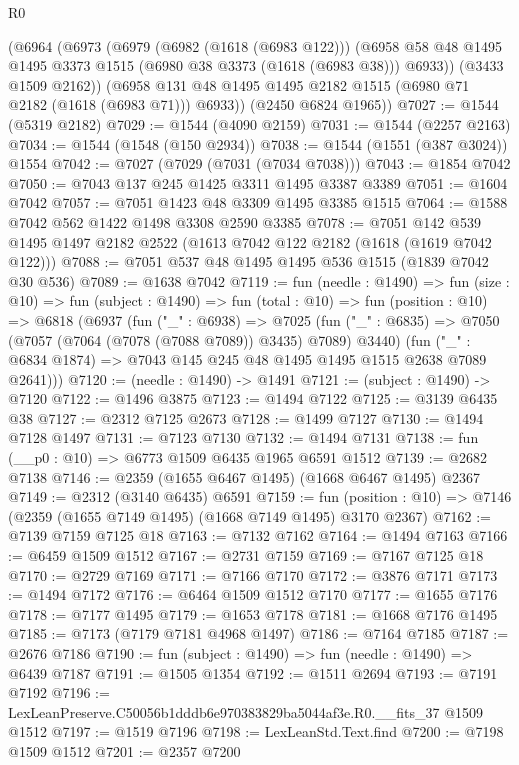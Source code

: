 \begin{lexlean}{R0}
\begin{coremodule}
      (@6964
        (@6973
          (@6979
            (@6982 (@1618 (@6983 @122)))
            (@6958 @58 @48 @1495 @1495 @3373 @1515 (@6980 @38 @3373 (@1618 (@6983 @38))) @6933))
          (@3433 @1509 @2162))
        (@6958 @131 @48 @1495 @1495 @2182 @1515 (@6980 @71 @2182 (@1618 (@6983 @71))) @6933))
      (@2450 @6824 @1965))
@7027 := @1544 (@5319 @2182)
@7029 := @1544 (@4090 @2159)
@7031 := @1544 (@2257 @2163)
@7034 := @1544 (@1548 (@150 @2934))
@7038 := @1544 (@1551 (@387 @3024)) @1554
@7042 := @7027 (@7029 (@7031 (@7034 @7038)))
@7043 := @1854 @7042
@7050 := @7043 @137 @245 @1425 @3311 @1495 @3387 @3389
@7051 := @1604 @7042
@7057 := @7051 @1423 @48 @3309 @1495 @3385 @1515
@7064 := @1588 @7042 @562 @1422 @1498 @3308 @2590 @3385
@7078 := @7051 @142 @539 @1495 @1497 @2182 @2522 (@1613 @7042 @122 @2182 (@1618 (@1619 @7042 @122)))
@7088 := @7051 @537 @48 @1495 @1495 @536 @1515 (@1839 @7042 @30 @536)
@7089 := @1638 @7042
@7119 := fun (needle : @1490) =>
  fun (size : @10) =>
  fun (subject : @1490) =>
  fun (total : @10) =>
  fun (position : @10) =>
  @6818
    (@6937
      (fun ("_" : @6938) =>
      @7025
        (fun ("_" : @6835) => @7050 (@7057 (@7064 (@7078 (@7088 @7089)) @3435) @7089) @3440)
        (fun ("_" : @6834 @1874) => @7043 @145 @245 @48 @1495 @1495 @1515 @2638 @7089 @2641)))
@7120 := (needle : @1490) -> @1491
@7121 := (subject : @1490) -> @7120
@7122 := @1496 @3875
@7123 := @1494 @7122
@7125 := @3139 @6435 @38
@7127 := @2312 @7125 @2673
@7128 := @1499 @7127
@7130 := @1494 @7128 @1497
@7131 := @7123 @7130
@7132 := @1494 @7131
@7138 := fun (__p0 : @10) => @6773 @1509 @6435 @1965 @6591 @1512
@7139 := @2682 @7138
@7146 := @2359 (@1655 @6467 @1495) (@1668 @6467 @1495) @2367
@7149 := @2312 (@3140 @6435) @6591
@7159 := fun (position : @10) => @7146 (@2359 (@1655 @7149 @1495) (@1668 @7149 @1495) @3170 @2367)
@7162 := @7139 @7159 @7125 @18
@7163 := @7132 @7162
@7164 := @1494 @7163
@7166 := @6459 @1509 @1512
@7167 := @2731 @7159
@7169 := @7167 @7125 @18
@7170 := @2729 @7169
@7171 := @7166 @7170
@7172 := @3876 @7171
@7173 := @1494 @7172
@7176 := @6464 @1509 @1512 @7170
@7177 := @1655 @7176
@7178 := @7177 @1495
@7179 := @1653 @7178
@7181 := @1668 @7176 @1495
@7185 := @7173 (@7179 @7181 @4968 @1497)
@7186 := @7164 @7185
@7187 := @2676 @7186
@7190 := fun (subject : @1490) => fun (needle : @1490) => @6439 @7187
@7191 := @1505 @1354
@7192 := @1511 @2694
@7193 := @7191 @7192
@7196 := LexLeanPreserve.C50056b1dddb6e970383829ba5044af3e.R0.__fits_37 @1509 @1512
@7197 := @1519 @7196
@7198 := LexLeanStd.Text.find
@7200 := @7198 @1509 @1512
@7201 := @2357 @7200

\end{coremodule}
\end{lexlean}
